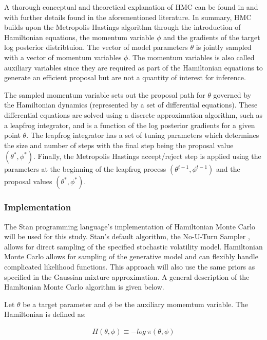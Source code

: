 \documentclass[12pt, a4paper]{article}
\begin{document}
        A thorough conceptual and theoretical explanation of HMC can be found in \citet{gelman2013bayesian} and \citet{betancourt2017conceptual} with further details found in the aforementioned literature. In summary, HMC builds upon the Metropolis Hastings algorithm through the introduction of Hamiltonian equations, the momentum variable $\phi$ and the gradients of the target log posterior distribtuion. The vector of model parameters $\theta$ is jointly sampled with a vector of momentum variables $\phi$. The momentum variables is also called auxiliary variables since they are required as part of the Hamiltonian equations to generate an efficient proposal but are not a quantity of interest for inference.

        The sampled momentum variable sets out the proposal path for $\theta$ governed by the Hamiltonian dynamics (represented by a set of differential equations). These differential equations are solved using a discrete approximation algorithm, such as a leapfrog integrator, and is a function of the log posterior gradients for a given point $\theta$. The leapfrog integrator has a set of tuning parameters which determines the size and number of steps with the final step being the proposal value $(\theta^{\ast}, \phi^{\ast})$. Finally, the Metropolis Hastings accept/reject step is applied using the parameters at the beginning of the leapfrog process $(\theta^{t-1}, \phi^{t-1})$ and the proposal values $(\theta^{\ast}, \phi^{\ast})$. 

        \subsubsection{Implementation}
        The Stan programming language's implementation of Hamiltonian Monte Carlo will be used for this study. Stan's default algorithm, the No-U-Turn Sampler \citep{hoffman2014no}, allows for direct sampling of the specified stochastic volatility model. Hamiltonian Monte Carlo allows for sampling of the generative model and can flexibly handle complicated likelihood functions. This approach will also use the same priors as specified in the Gaussian mixture approximation. A general description of the Hamltonian Monte Carlo algorithm is given below.

        Let $\theta$ be a target parameter and $\phi$ be the auxiliary momemtum variable. The Hamiltonian is defined as:

        $$
        \begin{aligned}
        H(\theta, \phi) \equiv - log \: \pi(\theta, \phi)
        \end{aligned}
        $$
\end{document}
